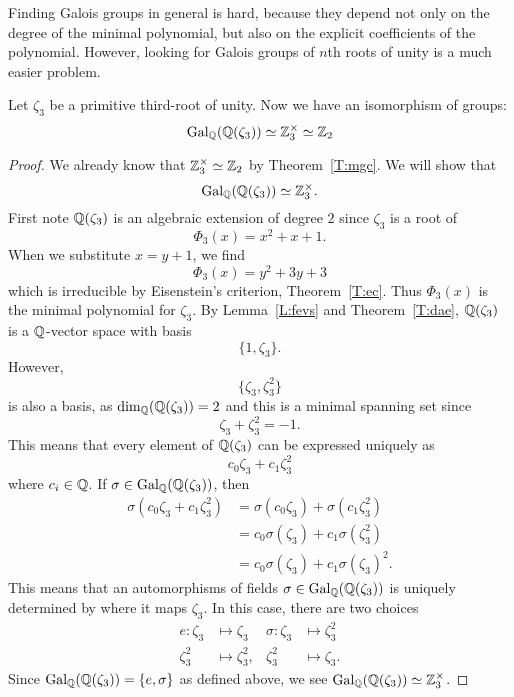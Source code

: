 \documentclass{ximera}
\begin{document}
Finding Galois groups in general is hard, because they depend not only
on the degree of the minimal polynomial, but also on the explicit
coefficients of the polynomial. However, looking for Galois groups of
$n$th roots of unity is a much easier problem.

\begin{example}[$\boldsymbol{\gal_{\pmb \Q}\pmb(\pmb\Q\pmb(\zeta_3\pmb)\pmb)}$]
  Let $\zeta_3$ be a primitive third-root of
  unity. Now we have an isomorphism of groups:
  \[
  \operatorname{Gal}_{\mathbb Q}(\mathbb Q(\zeta_3))\simeq\mathbb Z_3^\times\simeq \mathbb Z_2
  \]
  \begin{proof}
    We already know that $\mathbb Z_3^\times\simeq \mathbb Z_2$ by
    Theorem~\ref{T:mgc}. We will show that
    \[
    \operatorname{Gal}_{\mathbb Q}(\mathbb Q(\zeta_3))\simeq\mathbb Z_3^\times.
    \]
    First note $\mathbb Q(\zeta_3)$ is an algebraic extension of degree $2$
    since $\zeta_3$ is a root of
    \[
    \Phi_3(x) = x^2 + x + 1. 
    \]
    When we substitute $x = y+ 1$, we find
    \[
    \Phi_3(x) = y^2 + 3y + 3
    \]
    which is irreducible by Eisenstein's criterion,
    Theorem~\ref{T:ec}. Thus $\Phi_3(x)$ is the minimal polynomial for
    $\zeta_3$. By Lemma~\ref{L:fevs} and Theorem~\ref{T:dae},
    $\mathbb Q(\zeta_3)$ is a $\mathbb Q$-vector space with basis
    \[
    \{1,\zeta_3\}.
    \]
    However, 
    \[
    \{\zeta_3,\zeta_3^2\}
    \]
    is also a basis, as $\dim_\mathbb Q(\mathbb Q(\zeta_3))=2$ and this is a minimal
    spanning set since
    \[
    \zeta_3 + \zeta_3^2 = -1.
    \]
    This means that every element of $\mathbb Q(\zeta_3)$ can be expressed
    uniquely as
    \[
    c_0\zeta_3 + c_1 \zeta_3^2
    \]
    where $c_i\in\mathbb Q$. If $\sigma\in\operatorname{Gal}_\mathbb Q(\mathbb Q(\zeta_3))$, then
    \begin{align*}
      \sigma(c_0\zeta_3 + c_1 \zeta_3^2) &= \sigma(c_0\zeta_3) + \sigma(c_1 \zeta_3^2)\\
      &= c_0 \sigma(\zeta_3) + c_1 \sigma(\zeta_3^2)\\
      &= c_0 \sigma(\zeta_3) + c_1 \sigma(\zeta_3)^2.
    \end{align*}
    This means that an automorphisms of fields $\sigma \in
    \operatorname{Gal}_\mathbb Q(\mathbb Q(\zeta_3))$ is uniquely determined by where it maps
    $\zeta_3$. In this case, there are two choices
    \begin{align*}
      e :\zeta_3 &\mapsto \zeta_3 &  \sigma :\zeta_3 &\mapsto \zeta_3^2\\
         \zeta_3^2 &\mapsto \zeta_3^2, &          \zeta_3^2 &\mapsto \zeta_3.
    \end{align*}
    Since $\operatorname{Gal}_\mathbb Q(\mathbb Q(\zeta_3)) = \{e,\sigma\}$ as defined above, we
    see $\operatorname{Gal}_\mathbb Q(\mathbb Q(\zeta_3))\simeq\mathbb Z_3^\times$.
  \end{proof}
\end{example}
\end{document}
